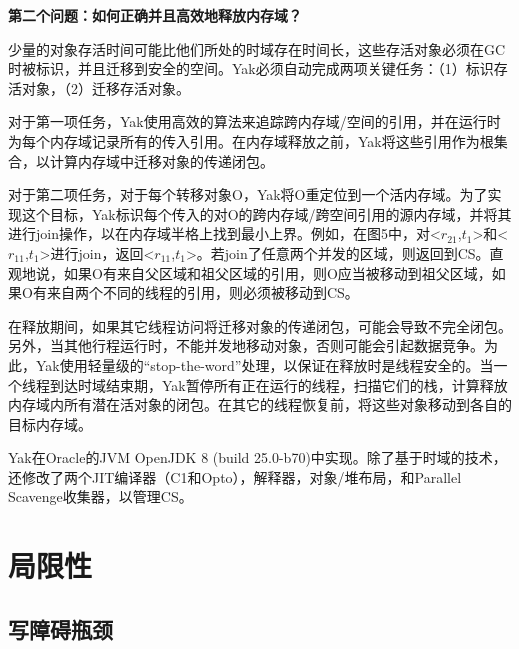 {\bfseries 第二个问题：如何正确并且高效地释放内存域？}

少量的对象存活时间可能比他们所处的时域存在时间长，这些存活对象必须在GC时被标识，并且迁移到安全的空间。Yak必须自动完成两项关键任务：（1）标识存活对象，（2）迁移存活对象。

对于第一项任务，Yak使用高效的算法来追踪跨内存域/空间的引用，并在运行时为每个内存域记录所有的传入引用。在内存域释放之前，Yak将这些引用作为根集合，以计算内存域中迁移对象的传递闭包。

对于第二项任务，对于每个转移对象O，Yak将O重定位到一个活内存域。为了实现这个目标，Yak标识每个传入的对O的跨内存域/跨空间引用的源内存域，并将其进行join操作，以在内存域半格上找到最小上界。例如，在图5中，对<$r_{21}$,$t_1$>和<$r_{11}$,$t_1$>进行join，返回<$r_{11}$,$t_1$>。若join了任意两个并发的区域，则返回到CS。直观地说，如果O有来自父区域和祖父区域的引用，则O应当被移动到祖父区域，如果O有来自两个不同的线程的引用，则必须被移动到CS。

在释放期间，如果其它线程访问将迁移对象的传递闭包，可能会导致不完全闭包。另外，当其他行程运行时，不能并发地移动对象，否则可能会引起数据竞争。为此，Yak使用轻量级的“stop-the-word”处理，以保证在释放时是线程安全的。当一个线程到达时域结束期，Yak暂停所有正在运行的线程，扫描它们的栈，计算释放内存域内所有潜在活对象的闭包。在其它的线程恢复前，将这些对象移动到各自的目标内存域。

Yak在Oracle的JVM OpenJDK 8 (build 25.0-b70)中实现。除了基于时域的技术，还修改了两个JIT编译器（C1和Opto），解释器，对象/堆布局，和Parallel Scavenge收集器，以管理CS。




\section{局限性}


\subsection{写障碍瓶颈}


